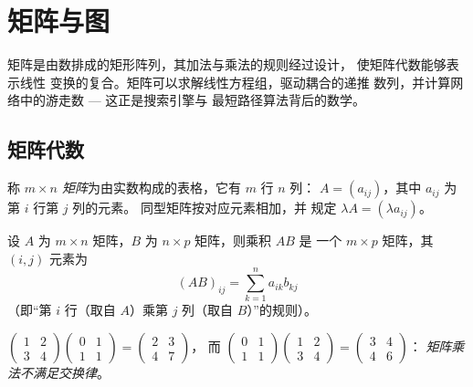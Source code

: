 \chapter{矩阵与图}\label{ch:g12:matrix}

矩阵是由数排成的矩形阵列，其加法与乘法的规则经过设计，
使矩阵代数能够表示线性
变换的复合。矩阵可以求解线性方程组，驱动耦合的递推
数列，并计算网络中的游走数 --- 这正是搜索引擎与
最短路径算法背后的数学。

\section{矩阵代数}

\begin{definition}[矩阵]\label{def:g12:matrix:matrix}
称 \emph{$m \times n$ 矩阵}为由实数构成的表格，它有
$m$ 行 $n$ 列：
$A = (a_{ij})$，其中 $a_{ij}$ 为第 $i$ 行第 $j$ 列的元素。
同型矩阵按对应元素相加，并
规定 $\lambda A = (\lambda a_{ij})$。
\end{definition}

\begin{definition}[矩阵乘积]\label{def:g12:matrix:product}
设 $A$ 为 $m \times n$ 矩阵，$B$ 为 $n \times p$ 矩阵，则乘积 $AB$ 是
一个 $m \times p$ 矩阵，其 $(i,j)$ 元素为
\[
(AB)_{ij} = \sum_{k=1}^{n} a_{ik} b_{kj}
\]
（即“第 $i$ 行（取自 $A$）乘第 $j$ 列（取自 $B$）”的规则）。
\end{definition}

\begin{example}
$\begin{pmatrix} 1 & 2\\ 3 & 4\end{pmatrix}
\begin{pmatrix} 0 & 1\\ 1 & 1\end{pmatrix}
= \begin{pmatrix} 2 & 3\\ 4 & 7\end{pmatrix}$，
\quad 而 \quad
$\begin{pmatrix} 0 & 1\\ 1 & 1\end{pmatrix}
\begin{pmatrix} 1 & 2\\ 3 & 4\end{pmatrix}
= \begin{pmatrix} 3 & 4\\ 4 & 6\end{pmatrix}$：
\emph{矩阵乘法不满足交换律}。
\end{example}

